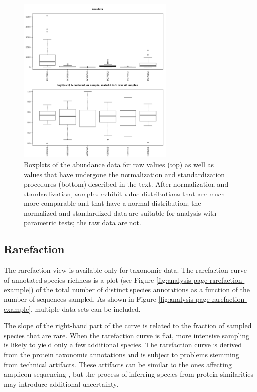 \documentclass[12pt,fullpage]{report}
\begin{document}
\begin{figure}
\begin{center}
\includegraphics[width=3in]{Images/boxplots.png}
\end{center}
\caption{
Boxplots of the abundance data for raw values (top) as well as values that have undergone the normalization and standardization procedures (bottom) described in the text. After normalization and standardization, samples exhibit value distributions that are much more comparable and that have a normal distribution; the normalized and standardized data are suitable for analysis with parametric tests; the raw data are not.
}
\label{fig:boxplots}
\end{figure}
\subsection{Rarefaction}
\label{section:analysis-page-rarefaction}

The rarefaction view is available only for taxonomic data. The
rarefaction curve of annotated species richness is a plot (see Figure
\ref{fig:analysis-page-rarefaction-example}) of the total number
of distinct species annotations as a function of the number of
sequences sampled. As shown in Figure \ref{fig:analysis-page-rarefaction-example},
multiple data sets can be included.

The slope of the right-hand part of the curve is related to the fraction of sampled species that are rare. When the rarefaction curve is flat, more intensive sampling is likely to yield only a few additional species. The rarefaction curve is derived from the protein taxonomic annotations and is subject to problems stemming from technical artifacts. These artifacts can be similar to the ones affecting amplicon sequencing \cite{RARE}, but the process of inferring species from protein similarities may introduce additional uncertainty.
\end{document}
